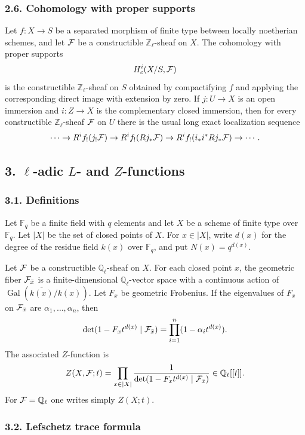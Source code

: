 \documentclass[11pt]{article}
\theoremstyle{plain}
\theoremstyle{definition}
\theoremstyle{remark}
\newcommand{\bF}{\mathbb F}
\newcommand{\bQ}{\mathbb Q}
\newcommand{\bZ}{\mathbb Z}
\DeclareMathOperator{\Gal}{Gal}
\begin{document}
\subsubsection*{2.6. Cohomology with proper supports}

Let $f:X\to S$ be a separated morphism of finite type between locally noetherian
schemes, and let $\mathcal F$ be a constructible $\bZ_\ell$-sheaf on $X$. The cohomology
with proper supports
\[
      H_c^i(X/S,\mathcal F)
\]
is the constructible $\bZ_\ell$-sheaf on $S$ obtained by compactifying $f$ and
applying the corresponding direct image with extension by zero. If
$j:U\to X$ is an open immersion and $i:Z\to X$ is the complementary closed
immersion, then for every constructible $\bZ_\ell$-sheaf $\mathcal F$ on $U$ there is the
usual long exact localization sequence
\[
\cdots\to R^if_!(j_!\mathcal F)\to R^if_!(Rj_*\mathcal F)\to
R^if_!(i_*i^*Rj_*\mathcal F)\to\cdots .
\]

\subsection*{3. $\ell$-adic $L$- and $Z$-functions}

\subsubsection*{3.1. Definitions}

Let $\bF_q$ be a finite field with $q$ elements and let $X$ be a scheme of finite
type over $\bF_q$. Let $|X|$ be the set of closed points of $X$. For
$x\in|X|$, write $d(x)$ for the degree of the residue field $k(x)$ over $\bF_q$, and
put $N(x)=q^{d(x)}$.

Let $\mathcal F$ be a constructible $\bQ_\ell$-sheaf on $X$. For each closed point $x$, the
geometric fiber $\mathcal F_{\bar x}$ is a finite-dimensional $\bQ_\ell$-vector space with
a continuous action of $\Gal(\overline{k(x)}/k(x))$. Let $F_x$ be geometric
Frobenius. If the eigenvalues of $F_x$ on $\mathcal F_{\bar x}$ are
$\alpha_1,\ldots,\alpha_n$, then
\[
  \det(1-F_xt^{d(x)}\mid \mathcal F_{\bar x})=\prod_{i=1}^n(1-\alpha_i t^{d(x)}).
\]
The associated $Z$-function is
\[
      Z(X,\cF;t)=\prod_{x\in|X|}
      {1\over\det(1-F_xt^{d(x)}\mid\cF_{\bar x})}\in\bQ_\ell[[t]].
\]
For $\cF=\bQ_\ell$ one writes simply $Z(X;t)$.

\subsubsection*{3.2. Lefschetz trace formula}
\end{document}
